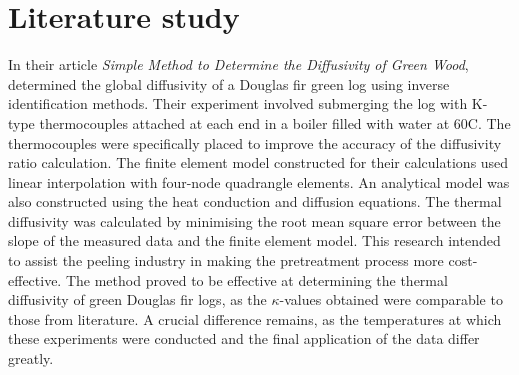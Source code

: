 \section{Literature study}\label{litstudy}

	
	In their article \textit{Simple Method to Determine the Diffusivity of Green Wood}, \citet{bioresource:2020}  determined the global diffusivity of a Douglas fir green log using inverse identification methods. 
	Their experiment involved submerging the log with K-type thermocouples attached at each end in a boiler filled with water at 60\textdegree C.
	The thermocouples were specifically placed to improve the accuracy of the diffusivity ratio calculation.
	The finite element model constructed for their calculations used linear interpolation with four-node quadrangle elements.
	An analytical model was also constructed using the heat conduction and diffusion equations.
	The thermal diffusivity was calculated by minimising the root mean square error between the slope of the measured data and the finite element model.
	This research intended to assist the peeling industry in making the pretreatment process more cost-effective.
	The method proved to be effective at determining the thermal diffusivity of green Douglas fir logs, as the $\kappa$-values obtained were comparable to those from literature.
	A crucial difference remains, as the temperatures at which these experiments were conducted and the final application of the data differ greatly.


